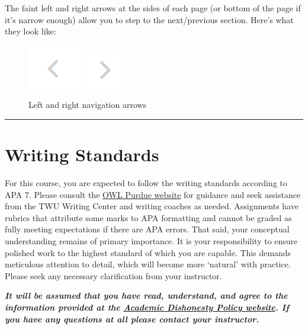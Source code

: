 \documentclass[
]{book}
\begin{document}
The faint left and right arrows at the sides of each page (or bottom of the page if it's narrow enough) allow you to step to the next/previous section. Here's what they look like:

\begin{figure}
 \includegraphics[width=0.93in]{assets/course-intro/left_arrow} \includegraphics[width=0.74in]{assets/course-intro/right_arrow} \caption{Left and right navigation arrows}\label{fig:unnamed-chunk-13}
 \end{figure}

\begin{center}\rule{0.5\linewidth}{0.5pt}\end{center}

\hypertarget{writing-standards}{%
\section*{Writing Standards}\label{writing-standards}}

For this course, you are expected to follow the writing standards according to APA 7. Please consult the \href{https://owl.purdue.edu/owl/research_and_citation/apa_style/apa_style_introduction.html}{OWL Purdue website} for guidance and seek assistance from the TWU Writing Center and writing coaches as needed. Assignments have rubrics that attribute some marks to APA formatting and cannot be graded as fully meeting expectations if there are APA errors. That said, your conceptual understanding remains of primary importance. It is your responsibility to ensure polished work to the highest standard of which you are capable. This demands meticulous attention to detail, which will become more `natural' with practice. Please seek any necessary clarification from your instructor.

\begin{caution}
\textbf{\emph{It will be assumed that you have read, understand, and
agree to the information provided at the
\href{https://www.twu.ca/student-handbook/university-policies/academic-misconduct/procedures-dealing-acts-academic-0}{Academic
Dishonesty Policy website}. If you have any questions at all please
contact your instructor.}}
\end{caution}
\end{document}
